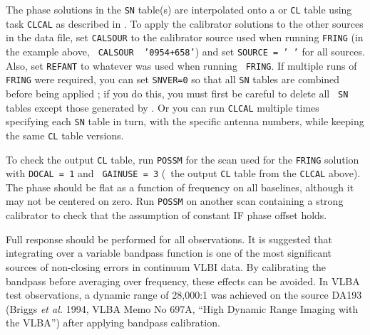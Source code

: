 The phase solutions in the {\tt SN} table(s) are interpolated onto a
 or {\tt CL} table using task {\tt CLCAL} as
described in .  To apply the calibrator solutions to the
other sources in the data file, set {\tt CALSOUR} to the calibrator
source used when running {\tt FRING} (in the example above, {\tt
CALSOUR \ '0954+658'}) and set {\tt SOURCE = ' '} for all sources.
Also, set {\tt REFANT} to whatever was used when running {\tt
FRING}\@.  If multiple runs of {\tt FRING} were required, you can set
{\tt SNVER=0} so that all {\tt SN} tables are combined before being
applied ; if you do this, you must first be careful to delete all {\tt
SN} tables except those generated by {\tt {}}\@.  Or you can
run {\tt CLCAL} multiple times specifying each {\tt SN} table in turn,
with the specific antenna numbers, while keeping the same {\tt CL}
table versions.

     To check the output {\tt CL} table, run {\tt POSSM} for the scan
used for the {\tt FRING} solution with {\tt DOCAL = 1} and {\tt
GAINUSE = 3} (\ie\ the output {\tt CL} table from the {\tt CLCAL}
above).  The phase should be flat as a function of frequency on all
baselines, although it may not be centered on zero.   Run {\tt POSSM}
on another scan containing a strong calibrator to check that the
assumption of constant IF phase offset holds.



Full  response  should be performed
for all observations.  It is suggested that integrating over a variable
bandpass function is one of the most significant sources of non-closing
errors in continuum VLBI data. By calibrating the bandpass before averaging
over frequency, these effects can be avoided.  In VLBA test observations,
a dynamic range of 28,000:1 was achieved on the source DA193 (Briggs
{\it et al.\/} 1994, VLBA Memo No 697A, ``High Dynamic Range Imaging
with the VLBA'') after applying bandpass calibration.

